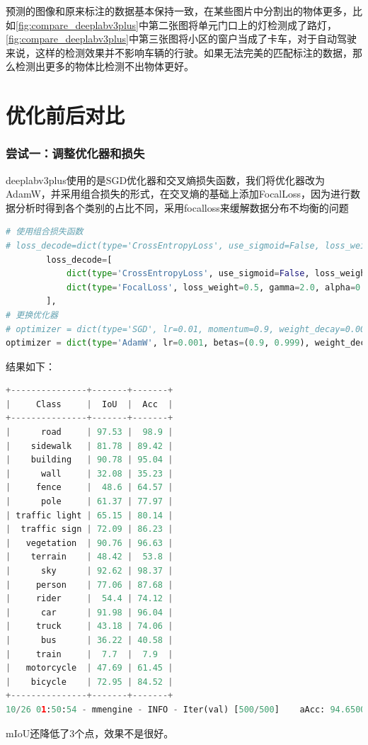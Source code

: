 \documentclass[12pt]{ctexart}
\begin{document}
预测的图像和原来标注的数据基本保持一致，在某些图片中分割出的物体更多，比如\ref{fig:compare_deeplabv3plus}中第二张图将单元门口上的灯检测成了路灯，\ref{fig:compare_deeplabv3plus}中第三张图将小区的窗户当成了卡车，对于自动驾驶来说，这样的检测效果并不影响车辆的行驶。如果无法完美的匹配标注的数据，那么检测出更多的物体比检测不出物体更好。
\newpage
\section{优化前后对比}
\subsubsection{尝试一：调整优化器和损失}
deeplabv3plus使用的是SGD优化器和交叉熵损失函数，我们将优化器改为AdamW，并采用组合损失的形式，在交叉熵的基础上添加FocalLoss，因为进行数据分析时得到各个类别的占比不同，采用focalloss来缓解数据分布不均衡的问题
\begin{lstlisting}[language=Python]
# 使用组合损失函数
# loss_decode=dict(type='CrossEntropyLoss', use_sigmoid=False, loss_weight=1.0)),
        loss_decode=[
            dict(type='CrossEntropyLoss', use_sigmoid=False, loss_weight=1.0),
            dict(type='FocalLoss', loss_weight=0.5, gamma=2.0, alpha=0.25)
        ],
# 更换优化器
# optimizer = dict(type='SGD', lr=0.01, momentum=0.9, weight_decay=0.0005)
optimizer = dict(type='AdamW', lr=0.001, betas=(0.9, 0.999), weight_decay=0.01)
\end{lstlisting}
结果如下：
\begin{lstlisting}[language=Python]
+---------------+-------+-------+
|     Class     |  IoU  |  Acc  |
+---------------+-------+-------+
|      road     | 97.53 |  98.9 |
|    sidewalk   | 81.78 | 89.42 |
|    building   | 90.78 | 95.04 |
|      wall     | 32.08 | 35.23 |
|     fence     |  48.6 | 64.57 |
|      pole     | 61.37 | 77.97 |
| traffic light | 65.15 | 80.14 |
|  traffic sign | 72.09 | 86.23 |
|   vegetation  | 90.76 | 96.63 |
|    terrain    | 48.42 |  53.8 |
|      sky      | 92.62 | 98.37 |
|     person    | 77.06 | 87.68 |
|     rider     |  54.4 | 74.12 |
|      car      | 91.98 | 96.04 |
|     truck     | 43.18 | 74.06 |
|      bus      | 36.22 | 40.58 |
|     train     |  7.7  |  7.9  |
|   motorcycle  | 47.69 | 61.45 |
|    bicycle    | 72.95 | 84.52 |
+---------------+-------+-------+
10/26 01:50:54 - mmengine - INFO - Iter(val) [500/500]    aAcc: 94.6500  mIoU: 63.8100  mAcc: 73.8200  data_time: 0.0112  time: 0.1686
\end{lstlisting}
mIoU还降低了3个点，效果不是很好。
\end{document}
